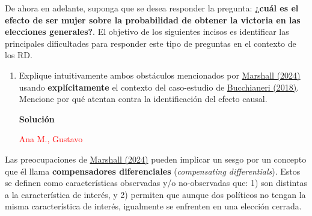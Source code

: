 \documentclass[a4paper, answers, addpoints, 11pt]{exam}
\newenvironment{solucion}{%
  \begin{mdframed}[
    backgroundcolor=blue!5,    %
    linecolor=blue!50,          %
    linewidth=2pt,              %
    leftmargin=10pt,            %
    rightmargin=8pt,           %
    topline=true,              %
    bottomline=true,            %
    roundcorner=10pt,           %
    innerleftmargin=10pt,       %
    innerrightmargin=10pt,      %
    innerbottommargin=10pt,     %
    innertopmargin=10pt         %
  ]%
  \begin{tcolorbox}[colframe=blue!50!black, colback=blue!50, coltitle=white, sharp corners=all, boxrule=1mm, width=\textwidth, halign=left, valign=center, top=0mm, bottom=0mm, left=0mm, right=0mm] \textbf{Solución} \end{tcolorbox} }{\end{mdframed}}
\begin{document}
De ahora en adelante, suponga que se desea responder la pregunta: \textbf{¿cuál es el efecto de ser mujer sobre la probabilidad de obtener la victoria en las elecciones generales?}. El objetivo de los siguientes incisos es identificar las principales dificultades para responder este tipo de preguntas en el contexto de los RD.

\bigskip

\begin{enumerate}[resume]
    
\item Explique intuitivamente ambos obstáculos mencionados por \href{https://onlinelibrary-wiley-com.ezproxy.uniandes.edu.co/doi/full/10.1111/ajps.12741}{Marshall (2024)} usando \textbf{explícitamente} el contexto del caso-estudio de \href{https://link.springer.com/article/10.1007/s11109-017-9407-7}{Bucchianeri (2018)}. Mencione por qué atentan contra la identificación del efecto causal. 

        \begin{solucion}
        \textcolor{red}{Ana M., Gustavo}
\end{solucion}
\end{enumerate}

\bigskip

Las preocupaciones de \href{https://onlinelibrary-wiley-com.ezproxy.uniandes.edu.co/doi/full/10.1111/ajps.12741}{Marshall (2024)} pueden implicar un sesgo por un concepto que él llama \textbf{compensadores diferenciales} (\textit{compensating differentials}). Estos se definen como características observadas y/o no-observadas que: 1) son distintas a la característica de interés, y 2) permiten que aunque dos políticos no tengan la misma característica de interés, igualmente se enfrenten en una elección cerrada. \\
\end{document}
